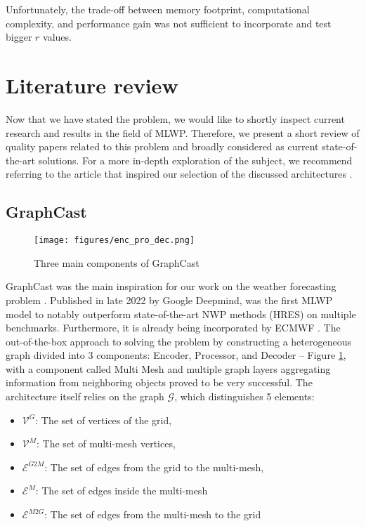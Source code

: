 Unfortunately, the trade-off between memory footprint, computational complexity, and performance gain was not sufficient to incorporate and test bigger $r$ values.

 
 \section{Literature review}
Now that we have stated the problem, we would like to shortly inspect current research and results in the field of MLWP. Therefore, we present a short review of quality papers related to this problem and broadly considered as current state-of-the-art solutions. For a more in-depth exploration of the subject, we recommend referring to the article that inspired our selection of the discussed architectures \cite{app132112019}.

\subsection{GraphCast} \label{sec:graphcast}
\begin{figure}[!ht]
    \centering
    \texttt{[image: figures/enc\_pro\_dec.png]}
    \caption{Three main components of GraphCast \cite{lam2023graphcast}}
    \label{fig:enc_pro_dec}
\end{figure}

GraphCast was the main inspiration for our work on the weather forecasting problem \cite{lam2023graphcast}. Published in late 2022 by Google Deepmind, was the first MLWP model to notably outperform state-of-the-art NWP methods (HRES) on multiple benchmarks. Furthermore, it is already being incorporated by ECMWF \cite{graphcast-deepmind}. The out-of-the-box approach to solving the problem by constructing a heterogeneous graph divided into 3 components: Encoder, Processor, and Decoder -- Figure \ref{fig:enc_pro_dec}, with a component called Multi Mesh and multiple graph layers aggregating information from neighboring objects proved to be very successful. The architecture itself relies on the graph $\mathcal{G}$, which distinguishes 5 elements:
\begin{itemize}
    \item $\mathcal{V}^{G}$: The set of vertices of the grid,
    \item $\mathcal{V}^M$: The set of multi-mesh vertices,
    \item $\mathcal{E}^{G2M}$: The set of edges from the grid to the multi-mesh,
    \item $\mathcal{E}^{M}$: The set of edges inside the multi-mesh
    \item $\mathcal{E}^{M2G}$: The set of edges from the multi-mesh to the grid
\end{itemize} 

